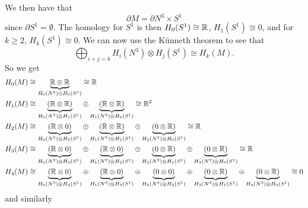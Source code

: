 \documentclass{article}
\begin{document}
We then have that 
\begin{equation}
    \partial M = \partial N^3 \times S^1
\end{equation}
since $\partial S^1 = \emptyset$. The homology for $S^1$ is then $H_0(S^1)\cong \mathbb{R}$, $H_1(S^1)\cong 0$, and for $k\geq 2$, $H_k(S^1)\cong 0$. We can now use the K\"unneth theorem to see that
\begin{equation}
    \bigoplus_{i+j=k} H_i(N^3)\otimes H_j(S^1) \cong H_k(M).
\end{equation}
So we get
\begin{align*}
    H_0(M) &\cong \underbrace{\mathbb{R} \otimes \mathbb{R}}_{H_0(N^3)\otimes H_0(S^1)} \cong \mathbb{R}\\
    H_1(M) &\cong \underbrace{(\mathbb{R} \otimes \mathbb{R})}_{H_0(N^3)\otimes H_1(S^1)} \oplus \underbrace{(\mathbb{R} \otimes \mathbb{R})}_{H_1(N^3)\otimes H_0(S^1)} \cong \mathbb{R}^2\\
    H_2(M) &\cong \underbrace{(\mathbb{R} \otimes 0)}_{H_0(N^3)\otimes H_2(S^1)} \oplus \underbrace{(\mathbb{R} \otimes \mathbb{R})}_{H_1(N^3)\otimes H_1(S^1)} \oplus \underbrace{(0 \otimes \mathbb{R})}_{H_2(N^3)\otimes H_0(S^1)} \cong \mathbb{R}\\
    H_3(M) &\cong \underbrace{(\mathbb{R} \otimes 0)}_{H_0(N^3)\otimes H_3(S^1)} \oplus \underbrace{(\mathbb{R} \otimes 0)}_{H_1(N^3)\otimes H_2(S^1)} \oplus \underbrace{(0 \otimes \mathbb{R})}_{H_2(N^3)\otimes H_1(S^1)} \oplus \underbrace{(0 \otimes \mathbb{R})}_{H_3(N^3)\otimes H_0(S^1)} \cong \mathbb{R}\\
    H_4(M) &\cong \underbrace{(\mathbb{R} \otimes 0)}_{H_0(N^3)\otimes H_4(S^1)} \oplus \underbrace{(\mathbb{R} \otimes 0)}_{H_1(N^3)\otimes H_3(S^1)} \oplus \underbrace{(0 \otimes 0)}_{H_2(N^3)\otimes H_2(S^1)} \oplus \underbrace{(0 \otimes \mathbb{R})}_{H_3(N^3)\otimes H_1(S^1)} \oplus \underbrace{(0 \otimes \mathbb{R})}_{H_4(N^3)\otimes H_0(S^1)} \cong 0
\end{align*}
and similarly 
\end{document}
